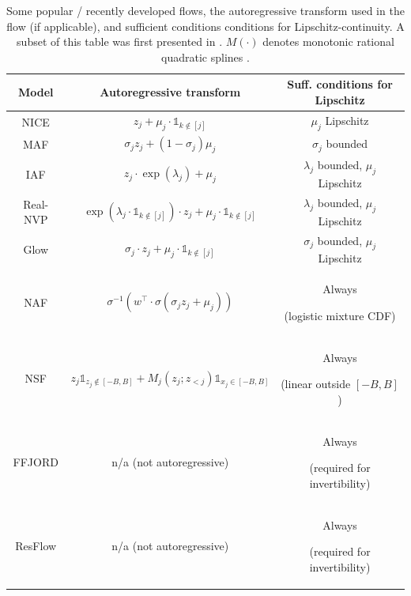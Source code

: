 \documentclass[twoside]{article}
\theoremstyle{definition}
\theoremstyle{remark}
\begin{document}
\begin{table}
  \centering
  \begin{tabular}{ccc}
    \toprule
    Model                                  & Autoregressive transform                                                                              & Suff. conditions for Lipschitz         \\
    \midrule
    NICE\citep{dinh2014nice}               & $z_j + \mu_j \cdot \mathds{1}_{k \not \in [j]}$                                                       & $\mu_j$ Lipschitz                      \\
    MAF\citep{papamakarios2017masked}      & $\sigma_j z_j + (1 - \sigma_j) \mu_j$                                                                 & $\sigma_j$ bounded                     \\
    IAF\citep{kingma2016improved}          & $z_j \cdot \exp(\lambda_j) + \mu_j$                                                                   & $\lambda_j$ bounded, $\mu_j$ Lipschitz \\
    Real-NVP\citep{dinh2016density}        & $\exp(\lambda_j \cdot \mathds{1}_{k \not\in[j]}) \cdot z_j + \mu_j \cdot \mathds{1}_{k \not \in [j]}$ & $\lambda_j$ bounded, $\mu_j$ Lipschitz \\
    Glow\citep{kingma2018glow}             & $\sigma_j \cdot z_j + \mu_j \cdot \mathds{1}_{k \not\in [j]}$                                         & $\sigma_j$ bounded, $\mu_j$ Lipschitz  \\
    NAF\citep{huang2018neural}             & $\sigma^{-1}(w^\top \cdot \sigma(\sigma_j z_j + \mu_j))$                                              & Always \par (logistic mixture CDF)          \\
    NSF\citep{durkan2019neural}            & $z_j \mathds{1}_{z_j \not\in [-B,B]} + M_j(z_j;z_{<j}) \mathds{1}_{x_j \in [-B,B]}$         & Always \par (linear outside $[-B,B]$)     \\
    FFJORD\citep{grathwohl2018ffjord} & n/a (not autoregressive)                                                                              & Always \par (required for invertibility)    \\
    ResFlow\citep{chen2019residual} & n/a (not autoregressive)                                                                              & Always \par (required for invertibility)    \\
    \bottomrule
  \end{tabular}
  \caption{Some popular / recently developed flows, the autoregressive transform used in the flow (if applicable),
  and sufficient conditions conditions for Lipschitz-continuity. A subset of this table was first presented
  in \citet{jaini2020tails}. $M(\cdot)$ denotes monotonic rational quadratic splines \citep{durkan2019neural}.}
  \label{tab:flows}
\end{table}
\end{document}
